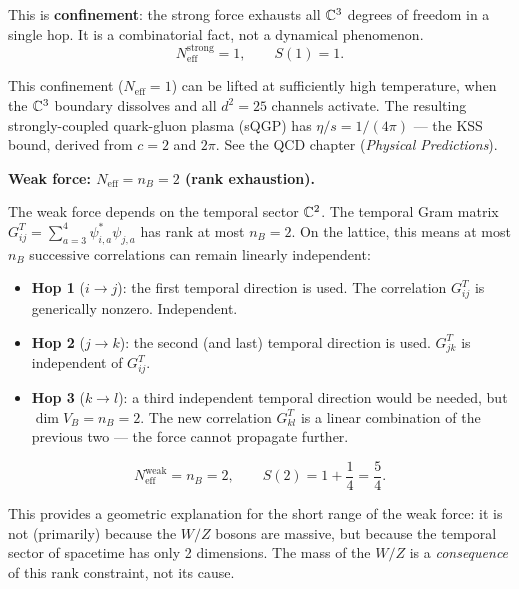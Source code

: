 This is \textbf{confinement}: the strong force exhausts all $\mathbb{C}^3$ degrees of freedom in a single hop. It is a combinatorial fact, not a dynamical phenomenon.
\begin{equation}
N_\text{eff}^\text{strong} = 1, \qquad S(1) = 1.
\end{equation}

\begin{remark}
This confinement ($N_\text{eff} = 1$) can be lifted at sufficiently high temperature, when the $\mathbb{C}^3$ boundary dissolves and all $d^2 = 25$ channels activate. The resulting strongly-coupled quark-gluon plasma (sQGP) has $\eta/s = 1/(4\pi)$ --- the KSS bound, derived from $c = 2$ and $2\pi$. See the QCD chapter (\textit{Physical Predictions}).
\end{remark}

\bigskip

\noindent\textbf{Weak force: $N_\text{eff} = n_B = 2$ (rank exhaustion).}

The weak force depends on the temporal sector $\mathbb{C}^2$. The temporal Gram matrix $G^T_{ij} = \sum_{a=3}^{4}\psi^*_{i,a}\psi_{j,a}$ has rank at most $n_B = 2$. On the lattice, this means at most $n_B$ successive correlations can remain linearly independent:

\begin{itemize}
\item \textbf{Hop 1} ($i \to j$): the first temporal direction is used. The correlation $G^T_{ij}$ is generically nonzero. Independent.
\item \textbf{Hop 2} ($j \to k$): the second (and last) temporal direction is used. $G^T_{jk}$ is independent of $G^T_{ij}$.
\item \textbf{Hop 3} ($k \to l$): a third independent temporal direction would be needed, but $\dim V_B = n_B = 2$. The new correlation $G^T_{kl}$ is a linear combination of the previous two --- the force cannot propagate further.
\end{itemize}

\begin{equation}
N_\text{eff}^\text{weak} = n_B = 2, \qquad S(2) = 1 + \frac{1}{4} = \frac{5}{4}.
\end{equation}

\begin{remark}
This provides a geometric explanation for the short range of the weak force: it is not (primarily) because the $W/Z$ bosons are massive, but because the temporal sector of spacetime has only 2 dimensions. The mass of the $W/Z$ is a \emph{consequence} of this rank constraint, not its cause.
\end{remark}

